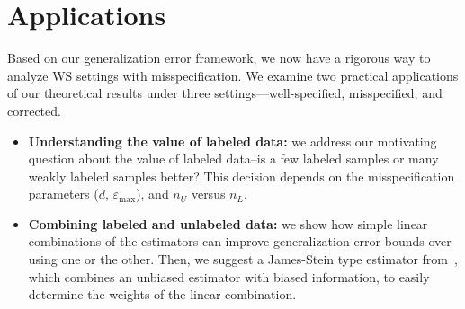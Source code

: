 \section{Applications}

Based on our generalization error framework, we now have a rigorous way to analyze WS settings with misspecification. We examine two practical applications of our theoretical results under three settings---well-specified, misspecified, and corrected.
\begin{itemize}
    \item \textbf{Understanding the value of labeled data:} we address our motivating question about the value of labeled data–is a few labeled samples or many weakly labeled samples better? This decision depends on the misspecification parameters ($d$, $\varepsilon_{\max}$), and $n_U$ versus $n_L$.
    \item \textbf{Combining labeled and unlabeled data:} we show how simple linear combinations of the estimators can improve generalization error bounds over using one or the other. Then, we suggest a James-Stein type estimator from~\cite{GreenStrawderman2001}, which combines an unbiased estimator with biased information, to easily determine the weights of the linear combination. %
\end{itemize}




